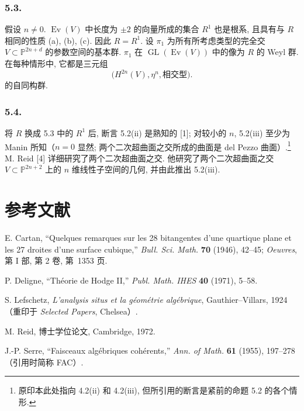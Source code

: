\subsubsection*{5.3.}
假设 $n\ne0$. $\operatorname{Ev}(V)$ 中长度为 $\pm2$ 的向量所成的集合 $R^1$ 也是根系, 且具有与 $R$ 相同的性质 (a), (b), (c). 因此 $R=R^1$. 设 $\pi_1$ 为所有所考虑类型的完全交 $V\subset\mathbb P^{2n+d}$ 的参数空间的基本群. $\pi_1$ 在 $\operatorname{GL}(\operatorname{Ev}(V))$ 中的像为 $R$ 的 Weyl 群. 在每种情形中, 它都是三元组
\[
 \bigl(H^{2n}(V),\eta^n,\text{相交型}\bigr).
\]
的自同构群.

\subsubsection*{5.4.}
将 $R$ 换成 5.3 中的 $R^1$ 后, 断言 5.2(ii) 是熟知的 [1]; 对较小的 $n$, 5.2(iii) 至少为 Manin 所知（$n=0$ 显然; 两个二次超曲面之交所成的曲面是 del Pezzo 曲面）.\footnote{原印本此处指向 4.2(ii) 和 4.2(iii), 但所引用的断言是紧前的命题 5.2 的各个情形.} M. Reid [4] 详细研究了两个二次超曲面之交. 他研究了两个二次超曲面之交 $V\subset\mathbb P^{2n+2}$ 上的 $n$ 维线性子空间的几何, 并由此推出 5.2(iii).

\section*{参考文献}

\begin{enumerate}[label={[\arabic*]}]
\item E. Cartan, ``Quelques remarques sur les 28 bitangentes d'une quartique
  plane et les 27 droites d'une surface cubique,'' \emph{Bull. Sci. Math.}
  \textbf{70} (1946), 42--45; \emph{Oeuvres}, 第 I 部, 第 2 卷, 第~1353 页.
\item P. Deligne, ``Th\'eorie de Hodge II,'' \emph{Publ. Math. IHES}
  \textbf{40} (1971), 5--58.
\item S. Lefschetz, \emph{L'analysis situs et la g\'eom\'etrie alg\'ebrique},
  Gauthier--Villars, 1924（重印于 \emph{Selected Papers}, Chelsea）.
\item M. Reid, 博士学位论文, Cambridge, 1972.
\item J.-P. Serre, ``Faisceaux alg\'ebriques coh\'erents,''
  \emph{Ann. of Math.} \textbf{61} (1955), 197--278（引用时简称 FAC）.
\end{enumerate}
